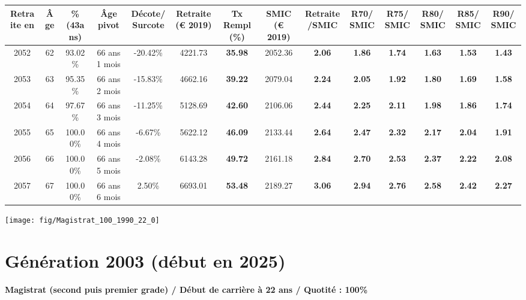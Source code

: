 \begin{adjustbox}{max width=\textwidth} 
\begin{tabular}[htb]{|c|c||c|c|c||c|c||c|c||c|c|c|c|c|} 
\hline 
 Retraite en &  Âge &  \%(43ans) &  Âge pivot &  Décote/Surcote &  Retraite (\euro{} 2019) &  Tx Rempl(\%) &  SMIC (\euro{} 2019) &  Retraite/SMIC &  R70/SMIC &  R75/SMIC &  R80/SMIC &  R85/SMIC &  R90/SMIC \\ 
\hline \hline 
 2052 &  62 &  93.02\% &  66 ans 1 mois &  -20.42\% &  4221.73 &  {\bf 35.98} &  2052.36 &  {\bf 2.06} &  {\bf 1.86} &  {\bf 1.74} &  {\bf 1.63} &  {\bf 1.53} &  {\bf 1.43} \\ 
\hline 
 2053 &  63 &  95.35\% &  66 ans 2 mois &  -15.83\% &  4662.16 &  {\bf 39.22} &  2079.04 &  {\bf 2.24} &  {\bf 2.05} &  {\bf 1.92} &  {\bf 1.80} &  {\bf 1.69} &  {\bf 1.58} \\ 
\hline 
 2054 &  64 &  97.67\% &  66 ans 3 mois &  -11.25\% &  5128.69 &  {\bf 42.60} &  2106.06 &  {\bf 2.44} &  {\bf 2.25} &  {\bf 2.11} &  {\bf 1.98} &  {\bf 1.86} &  {\bf 1.74} \\ 
\hline 
 2055 &  65 &  100.00\% &  66 ans 4 mois &  -6.67\% &  5622.12 &  {\bf 46.09} &  2133.44 &  {\bf 2.64} &  {\bf 2.47} &  {\bf 2.32} &  {\bf 2.17} &  {\bf 2.04} &  {\bf 1.91} \\ 
\hline 
 2056 &  66 &  100.00\% &  66 ans 5 mois &  -2.08\% &  6143.28 &  {\bf 49.72} &  2161.18 &  {\bf 2.84} &  {\bf 2.70} &  {\bf 2.53} &  {\bf 2.37} &  {\bf 2.22} &  {\bf 2.08} \\ 
\hline 
 2057 &  67 &  100.00\% &  66 ans 6 mois &  2.50\% &  6693.01 &  {\bf 53.48} &  2189.27 &  {\bf 3.06} &  {\bf 2.94} &  {\bf 2.76} &  {\bf 2.58} &  {\bf 2.42} &  {\bf 2.27} \\ 
\hline 
\hline 
\end{tabular} 
\end{adjustbox} 
 
 \vspace{0.1cm} 

 {\hspace{-2.2cm}\texttt{[image: fig/Magistrat\_100\_1990\_22\_0]}} 

\newpage 
 
\section{Génération 2003 (début en 2025)\label{Magistrat_100_2003_22_0}} 
 
{\bf \noindent Magistrat (second puis premier grade) / Début de carrière à 22 ans / Quotité : 100\%}  ~ 


